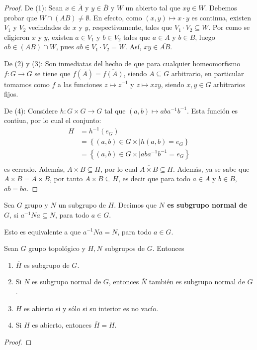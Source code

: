 \documentclass[12pt]{report}
\theoremstyle{largebreak}
\newcommand{\cf}[3]{\ensuremath{#1:#2\rightarrow#3}}
\newcommand{\Cls}[1]{\ensuremath{\overline{#1}}}
\begin{document}
    \begin{proof}
        De (1): Sean $x\in \Cls{A}$ y $y\in \Cls{B}$ y $W$ un abierto tal que $xy\in W$. Debemos probar que $W\cap (AB)\neq\emptyset$. En efecto, como $(x,y)\mapsto x\cdot y$ es continua, existen $V_1$ y $V_2$ vecindades de $x$ y $y$, respectivamente, tales que $V_1\cdot V_2\subseteq W$. Por como se eligieron $x$ y $y$, existen $a\in V_1$ y $b\in V_2$ tales que $a\in A$ y $b\in B$, luego $ab\in (AB)\cap W$, pues $ab\in V_1\cdot V_2=W$. Así, $xy\in \Cls{AB}$.

        De (2) y (3): Son inmediatas del hecho de que para cualquier homeomorfismo $\cf{f}{G}{G}$ se tiene que $f(\Cls{A})=\Cls{f(A)}$, siendo $A\subseteq G$ arbitrario, en particular tomamos como $f$ a las funciones $z\mapsto z^{-1}$ y $z\mapsto xzy$, siendo $x,y\in G$ arbitrarios fijos.

        De (4): Considere $\cf{h}{G\times G}{G}$ tal que $(a,b)\mapsto aba^{-1}b^{-1}$. Esta función es contiua, por lo cual el conjunto:
        \begin{equation*}
            \begin{split}
                H&= h^{-1}(e_G)\\
                &=\left\{(a,b)\in G\times\Big| h(a,b)=e_G \right\}\\
                &=\left\{(a,b)\in G\times\Big| aba^{-1}b^{-1}=e_G \right\}\\
            \end{split}
        \end{equation*}
        es cerrado. Además, $A\times B\subseteq H$, por lo cual $\Cls{A\times B} \subseteq H$. Además, ya se sabe que $\Cls{A\times B}=\Cls{A}\times \Cls{B}$, por tanto $\Cls{A}\times\Cls{B}\subseteq H$, es decir que para todo $a\in\Cls{A}$ y $b\in\Cls{B}$, $ab=ba$.
    \end{proof}

    \begin{mydef}
        Sea $G$ grupo y $N$ un subgrupo de $H$. Decimos que \textbf{$N$ es subgrupo normal de $G$}, si $a^{-1}Na\subseteq N$, para todo $a\in G$.

        Esto es equivalente a que $a^{-1}Na=N$, para todo $a\in G$.
    \end{mydef}

    \begin{propo}
        Sean $G$ grupo topológico y $H,N$ subgrupos de $G$. Entonces
        \begin{enumerate}
            \item $\Cls{H}$ es subgrupo de $G$.
            \item Si $N$ es subgrupo normal de $G$, entonces $\Cls{N}$ también es subgrupo normal de $G$.
            \item $H$ es abierto si y sólo si su interior es no vacío.
            \item Si $H$ es abierto, entonces $\Cls{H}=H$.
        \end{enumerate}
    \end{propo}

    \begin{proof}
    \end{proof}
\end{document}
